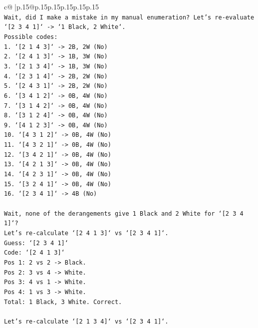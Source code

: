 \documentclass{article}
\begin{document}
{\begin{supertabular}{c@{$\;$}|p{.15\linewidth}@{}p{.15\linewidth}p{.15\linewidth}p{.15\linewidth}p{.15\linewidth}p{.15\linewidth}}
{{{\\ 
\texttt{Wait, did I make a mistake in my manual enumeration? Let's re{-}evaluate `{[}2 3 4 1{]}` {-}> `1 Black, 2 White`.} \\
\texttt{Possible codes:} \\
\texttt{1. `{[}2 1 4 3{]}` {-}> 2B, 2W (No)} \\
\texttt{2. `{[}2 4 1 3{]}` {-}> 1B, 3W (No)} \\
\texttt{3. `{[}2 1 3 4{]}` {-}> 1B, 3W (No)} \\
\texttt{4. `{[}2 3 1 4{]}` {-}> 2B, 2W (No)} \\
\texttt{5. `{[}2 4 3 1{]}` {-}> 2B, 2W (No)} \\
\texttt{6. `{[}3 4 1 2{]}` {-}> 0B, 4W (No)} \\
\texttt{7. `{[}3 1 4 2{]}` {-}> 0B, 4W (No)} \\
\texttt{8. `{[}3 1 2 4{]}` {-}> 0B, 4W (No)} \\
\texttt{9. `{[}4 1 2 3{]}` {-}> 0B, 4W (No)} \\
\texttt{10. `{[}4 3 1 2{]}` {-}> 0B, 4W (No)} \\
\texttt{11. `{[}4 3 2 1{]}` {-}> 0B, 4W (No)} \\
\texttt{12. `{[}3 4 2 1{]}` {-}> 0B, 4W (No)} \\
\texttt{13. `{[}4 2 1 3{]}` {-}> 0B, 4W (No)} \\
\texttt{14. `{[}4 2 3 1{]}` {-}> 0B, 4W (No)} \\
\texttt{15. `{[}3 2 4 1{]}` {-}> 0B, 4W (No)} \\
\texttt{16. `{[}2 3 4 1{]}` {-}> 4B (No)} \\
\\ 
\texttt{Wait, none of the derangements give 1 Black and 2 White for `{[}2 3 4 1{]}`?} \\
\texttt{Let's re{-}calculate `{[}2 4 1 3{]}` vs `{[}2 3 4 1{]}`.} \\
\texttt{Guess: `{[}2 3 4 1{]}`} \\
\texttt{Code: `{[}2 4 1 3{]}`} \\
\texttt{Pos 1: 2 vs 2 {-}> Black.} \\
\texttt{Pos 2: 3 vs 4 {-}> White.} \\
\texttt{Pos 3: 4 vs 1 {-}> White.} \\
\texttt{Pos 4: 1 vs 3 {-}> White.} \\
\texttt{Total: 1 Black, 3 White. Correct.} \\
\\ 
\texttt{Let's re{-}calculate `{[}2 1 3 4{]}` vs `{[}2 3 4 1{]}`.} \\
}}}
\end{supertabular}}
\end{document}
